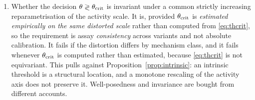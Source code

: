 \begin{enumerate}[leftmargin=*, itemsep=2pt]
      Two patients matched at $\bar m$ and sharing $K_m$ separate exactly:
      \begin{equation}
      \mu_A - \mu_B \;=\; (k_{e,A} - k_{e,B})\,(\mtol - \bar m),
      \label{eq:musplit}
      \end{equation}
      since point-matching forces
      $\theta_A - \theta_B = -(k_{e,A} - k_{e,B})(K_m + \bar m)$. Two observationally
      identical patients diverge linearly in how far the tolerable level sits above the
      operating point, and coincide when $\mtol = \bar m$.
\item \label{sec:invariance}Whether the decision $\theta \gtrless \theta_{\mathrm{crit}}$ is invariant under
      a common strictly increasing reparametrisation of the activity scale. It is, provided
      $\theta_{\mathrm{crit}}$ is \emph{estimated empirically on the same distorted scale} rather than
      computed from \eqref{eq:thcrit}, so the requirement is assay \emph{consistency} across
      variants and not absolute calibration. It fails if the distortion differs by mechanism
      class, and it fails whenever $\theta_{\mathrm{crit}}$ is computed rather than estimated, because
      \eqref{eq:thcrit} is not equivariant. This pulls against
      Proposition~\ref{prop:intrinsic}: an intrinsic
      threshold is a structural location, and a monotone rescaling of the activity axis does
      not preserve it. Well-posedness and invariance are bought from different accounts.
\end{enumerate}

